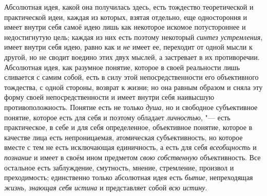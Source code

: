 Абсолютная идея, какой она получилась здесь, есть тождество
теоретической и практической идеи, каждая из которых, взятая отдельно, еще
одностороння и имеет внутри себя самоё идею лишь как некоторое искомое
потустороннее и недостигнутую цель; каждая из них есть поэтому некоторый
{\em синтез устремления},
имеет внутри себя идею, равно как и
{\em не} имеет ее,
переходит от одной мысли к другой, но не сводит воедино этих двух мыслей, а
застревает в их противоречии. Абсолютная идея, как разумное понятие,
которое в своей реальности лишь сливается с самим собой, есть в силу этой
непосредственности его объективного тождества, с одной стороны, возврат к
жизни; но она равным образом и сняла эту форму своей непосредственности и
имеет внутри себя наивысшую противоположность. Понятие есть не только
{\em душа}, но и
свободное субъективное понятие, которое есть для себя и поэтому обладает
{\em личностью}, "--- есть
практическое, в себе и для себя определенное, объективное понятие, которое
в качестве лица есть непроницаемая, атомическая субъективность, но которое
вместе с тем не есть исключающая единичность, а есть для себя
{\em всеобщность} и
{\em познание} и имеет в
своём ином предметом {\em свою
собственную} объективность. Все остальное есть заблуждение,
смутность, мнение, стремление, произвол и преходимость; единственно только
абсолютная идея есть {\em бытие},
непреходящая {\em жизнь,
знающая себя истина} и представляет собой
{\em всю истину}.

